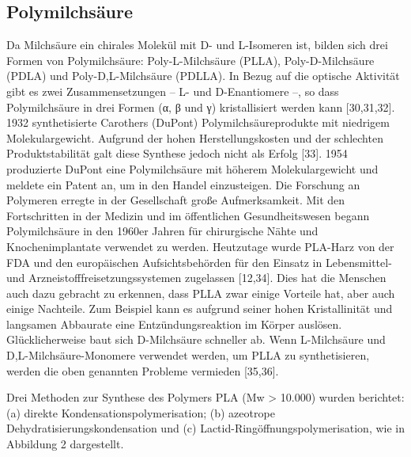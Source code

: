 \documentclass[10pt]{article}
\begin{document}
    \subsection{Polymilchsäure}

    Da Milchsäure ein chirales Molekül mit D- und L-Isomeren ist, bilden sich drei Formen von Polymilchsäure: Poly-L-Milchsäure (PLLA), Poly-D-Milchsäure (PDLA) und Poly-D,L-Milchsäure (PDLLA). In Bezug auf die optische Aktivität gibt es zwei Zusammensetzungen – L- und D-Enantiomere –, so dass Polymilchsäure in drei Formen (α, β und γ) kristallisiert werden kann [30,31,32].
    1932 synthetisierte Carothers (DuPont) Polymilchsäureprodukte mit niedrigem Molekulargewicht.
    Aufgrund der hohen Herstellungskosten und der schlechten Produktstabilität galt diese Synthese jedoch nicht als Erfolg [33].
    1954 produzierte DuPont eine Polymilchsäure mit höherem Molekulargewicht und meldete ein Patent an, um in den Handel einzusteigen.
    Die Forschung an Polymeren erregte in der Gesellschaft große Aufmerksamkeit.
    Mit den Fortschritten in der Medizin und im öffentlichen Gesundheitswesen begann Polymilchsäure in den 1960er Jahren für chirurgische Nähte und Knochenimplantate verwendet zu werden.
    Heutzutage wurde PLA-Harz von der FDA und den europäischen Aufsichtsbehörden für den Einsatz in Lebensmittel- und Arzneistofffreisetzungssystemen zugelassen [12,34].
    Dies hat die Menschen auch dazu gebracht zu erkennen, dass PLLA zwar einige Vorteile hat, aber auch einige Nachteile.
    Zum Beispiel kann es aufgrund seiner hohen Kristallinität und langsamen Abbaurate eine Entzündungsreaktion im Körper auslösen.
    Glücklicherweise baut sich D-Milchsäure schneller ab.
    Wenn L-Milchsäure und D,L-Milchsäure-Monomere verwendet werden, um PLLA zu synthetisieren, werden die oben genannten Probleme vermieden [35,36].

    Drei Methoden zur Synthese des Polymers PLA (Mw > 10.000) wurden berichtet: (a) direkte Kondensationspolymerisation; (b) azeotrope Dehydratisierungskondensation und (c) Lactid-Ringöffnungspolymerisation, wie in Abbildung 2 dargestellt.
\end{document}
